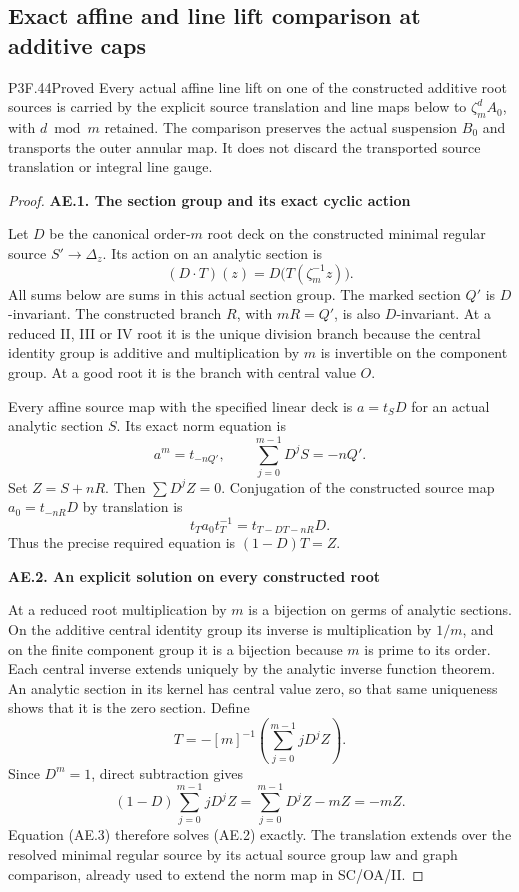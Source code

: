 \subsection{Exact affine and line lift comparison at additive caps}

\begin{statement}{P3F.44}{Proved}
Every actual affine line lift on one of the constructed additive root sources is carried by the explicit source translation and line maps below to $\zeta_m^d A_0$, with $d\bmod m$ retained. The comparison preserves the actual suspension $B_0$ and transports the outer annular map. It does not discard the transported source translation or integral line gauge.
\end{statement}
\begin{proof}
\par

\medskip\noindent\textbf{AE.1. The section group and its exact cyclic action}

Let \(D\) be the canonical order-\(m\) root deck on the
constructed minimal regular source \(S'\to\Delta_z\). Its
action on an analytic section is
\[
 (D\cdot T)(z)=D\bigl(T(\zeta_m^{-1}z)\bigr).
\]
All sums below are sums in this actual section group. The marked
section \(Q'\) is \(D\)-invariant. The constructed branch
\(R\), with \(mR=Q'\), is also \(D\)-invariant. At a
reduced II, III or IV root it is the unique division branch
because the central identity group is additive and multiplication
by \(m\) is invertible on the component group. At a good root
it is the branch with central value \(O\).

Every affine source map with the specified linear deck is
\(a=t_S D\) for an actual analytic section \(S\). Its exact
norm equation is
\[
 a^m=t_{-nQ'},\qquad
 \sum_{j=0}^{m-1}D^jS=-nQ'.                         \tag{AE.1}
\]
Set \(Z=S+nR\). Then \(\sum D^jZ=0\). Conjugation of the
constructed source map \(a_0=t_{-nR}D\) by translation is
\[
 t_T a_0t_T^{-1}=t_{T-DT-nR}D.                    \tag{AE.2}
\]
Thus the precise required equation is \((1-D)T=Z\).

\par

\medskip\noindent\textbf{AE.2. An explicit solution on every constructed root}

At a reduced root multiplication by \(m\) is a bijection on
germs of analytic sections. On the additive central identity
group its inverse is multiplication by \(1/m\), and on the
finite component group it is a bijection because \(m\) is
prime to its order. Each central inverse extends uniquely by
the analytic inverse function theorem. An analytic section in
its kernel has central value zero, so that same uniqueness
shows that it is the zero section. Define
\[
 T=-[m]^{-1}\left(\sum_{j=0}^{m-1}jD^jZ\right).
                                                               \tag{AE.3}
\]
Since \(D^m=1\), direct subtraction gives
\[
 (1-D)\sum_{j=0}^{m-1}jD^jZ
   =\sum_{j=0}^{m-1}D^jZ-mZ=-mZ.
\]
Equation (AE.3) therefore solves (AE.2) exactly. The translation
extends over the resolved minimal regular source by its actual
source group law and graph comparison, already used to extend
the norm map in SC/OA/II.


\end{proof}
